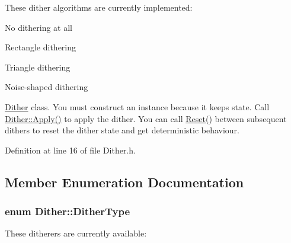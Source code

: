 These dither algorithms are currently implemented\+:
\begin{DoxyItemize}
\item No dithering at all
\item Rectangle dithering
\item Triangle dithering
\item Noise-\/shaped dithering
\end{DoxyItemize}

\hyperlink{class_dither}{Dither} class. You must construct an instance because it keeps state. Call \hyperlink{class_dither_a6c3a234d3ff2ea8dff4fa39b2172f3f5}{Dither\+::\+Apply()} to apply the dither. You can call \hyperlink{class_dither_a39eb37b93d93a262e4beea29488e573a}{Reset()} between subsequent dithers to reset the dither state and get deterministic behaviour. 

Definition at line 16 of file Dither.\+h.



\subsection{Member Enumeration Documentation}
\subsubsection[{\texorpdfstring{Dither\+Type}{DitherType}}]{\setlength{\rightskip}{0pt plus 5cm}enum {\bf Dither\+::\+Dither\+Type}}\hypertarget{class_dither_adea8077a2ba5a6c4ad2f11ed20cd4086}{}\label{class_dither_adea8077a2ba5a6c4ad2f11ed20cd4086}


These ditherers are currently available\+: 

